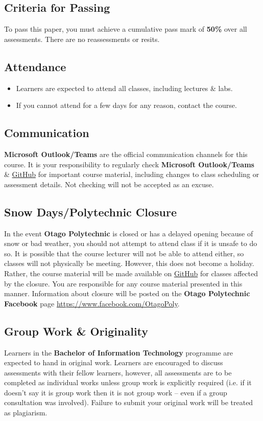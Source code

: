 \documentclass{article}
\begin{document}
\subsection*{Criteria for Passing}
To pass this paper, you must achieve a cumulative pass mark of \textbf{50\%} over all assessments. There are no reassessments or resits.

\subsection*{Attendance}
\begin{itemize}
	\item Learners are expected to attend all classes, including lectures \& labs.
	\item If you cannot attend for a few days for any reason, contact the course.
\end{itemize}

\subsection*{Communication}
\textbf{Microsoft Outlook/Teams} are the official communication channels for this course. It is your responsibility to regularly check \textbf{Microsoft Outlook/Teams} \& \href{https://github.com/otago-polytechnic-bit-courses/IN607-intro-app-dev-concepts}{GitHub} for important course material, including changes to class scheduling or assessment details. Not checking will not be accepted as an excuse.

\subsection*{Snow Days/Polytechnic Closure}
In the event \textbf{Otago Polytechnic} is closed or has a delayed opening because of snow or bad weather, you should not attempt to attend class if it is unsafe to do so. It is possible that the course lecturer will not be able to attend either, so classes will not physically be meeting. However, this does not become a holiday. Rather, the course material will be made available on \href{https://github.com/otago-polytechnic-bit-courses/IN607-intro-app-dev-concepts}{GitHub} for classes affected by the closure. You are responsible for any course material presented in this manner. Information about closure will be posted on the \textbf{Otago Polytechnic Facebook} page \href{https://www.facebook.com/OtagoPoly}{https://www.facebook.com/OtagoPoly}.

\subsection*{Group Work \& Originality}
Learners in the \textbf{Bachelor of Information Technology} programme are expected to hand in original work. Learners are encouraged to discuss assessments with their fellow learners, however, all assessments are to be completed as individual works unless group work is explicitly required (i.e. if it doesn’t say it is group work then it is not group work – even if a group consultation was involved). Failure to submit your original work will be treated as plagiarism.
\end{document}
